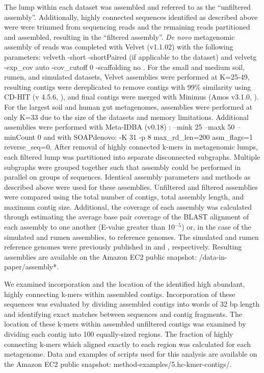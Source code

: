 \documentclass[10pt]{article}
\begin{document}
The lump within each dataset was assembled and referred to as the
``unfiltered assembly''.  Additionally, highly connected sequences
identified as described above were were trimmed from sequencing reads
and the remaining reads partitioned and assembled, resulting in the
``filtered assembly''.  \emph{De novo} metagenomic assembly of reads
was completed with Velvet (v1.1.02) with the following parameters:
velveth -short -shortPaired (if applicable to the dataset) and velvetg
-exp\_cov auto -cov\_cutoff 0 -scaffolding no \cite{Zerbino:2008p665}.
For the small and medium soil, rumen, and simulated datasets, Velvet
assemblies were performed at K=25-49, resulting contigs were
dereplicated to remove contigs with 99\% similarity using CD-HIT (v
4.5.6, \cite{Li:2001p1337}), and final contigs were merged with
Minimus (Amos v3.1.0, \cite{Sommer:2007p1253}).  For the largest soil
and human gut metagenomes, assemblies were performed at only K=33 due
to the size of the datasets and memory limitations.  Additional
assemblies were performed with Meta-IDBA (v0.18) \cite{Peng:2011p898}
: --mink 25 --maxk 50 --minCount 0 and with SOAPdenovo: -K 31 -p 8
max\_rd\_len=200 asm\_flags=1 reverse\_seq=0.  After removal of highly
connected k-mers in metagenomic lumps, each filtered lump was
partitioned into separate disconnected subgraphs.  Multiple subgraphs
were grouped together such that assembly could be performed in
parallel on groups of sequences.  Identical assembly parameters and
methods as described above were used for these assemblies.  Unfiltered
and filtered assemblies were compared using the total number of
contigs, total assembly length, and maximum contig size.  Additional,
the coverage of each assembly was calculated through estimating the
average base pair coverage of the BLAST alignment of each assembly to
one another (E-value greater than 10$^{-5}$) or, in the case of the
simulated and rumen assemblies, to reference genomes.  The simulated
and rumen reference genomes were previously published in
\cite{Hess:2011p686} and \cite{Pignatelli:2011p742}, respectively.
Resulting assemblies are available on the Amazon EC2 public snapshot:
/data-in-paper/assembly*.

We examined incorporation and the location of the identified high
abundant, highly connecting k-mers within assembled contigs.
Incorporation of these sequences was evaluated by dividing assembled
contigs into words of 32 bp length and identifying exact matches
between sequences and contig fragments.  The location of these k-mers
within assembled unfiltered contigs was examined by dividing each
contig into 100 equally-sized regions.  The fraction of highly
connecting k-mers which aligned exactly to each region was calculated
for each metagenome. Data and examples of scripts used for this
analysis are available on the Amazon EC2 public snapshot:
method-examples/5.hc-kmer-contigs/.
\end{document}
